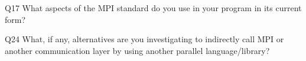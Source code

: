 \begin{description}%
\item{Q17} What aspects of the MPI standard do you use in your program in its current form?%
\item{Q24} What, if any, alternatives are you investigating to indirectly call MPI or another communication layer by using another parallel language/library?%
\end{description}%
